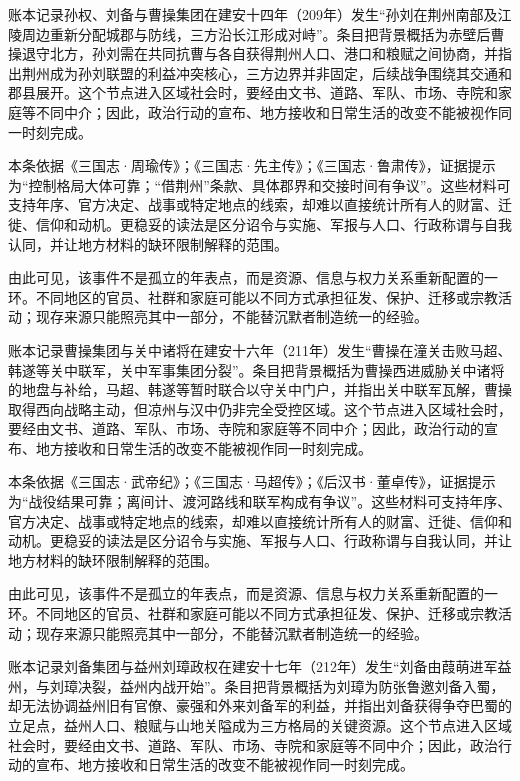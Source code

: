 账本记录孙权、刘备与曹操集团在建安十四年（209年）发生“孙刘在荆州南部及江陵周边重新分配城郡与防线，三方沿长江形成对峙”。条目把背景概括为赤壁后曹操退守北方，孙刘需在共同抗曹与各自获得荆州人口、港口和粮赋之间协商，并指出荆州成为孙刘联盟的利益冲突核心，三方边界并非固定，后续战争围绕其交通和郡县展开。这个节点进入区域社会时，要经由文书、道路、军队、市场、寺院和家庭等不同中介；因此，政治行动的宣布、地方接收和日常生活的改变不能被视作同一时刻完成。

本条依据《三国志·周瑜传》；《三国志·先主传》；《三国志·鲁肃传》，证据提示为“控制格局大体可靠；“借荆州”条款、具体郡界和交接时间有争议”。这些材料可支持年序、官方决定、战事或特定地点的线索，却难以直接统计所有人的财富、迁徙、信仰和动机。更稳妥的读法是区分诏令与实施、军报与人口、行政称谓与自我认同，并让地方材料的缺环限制解释的范围。

由此可见，该事件不是孤立的年表点，而是资源、信息与权力关系重新配置的一环。不同地区的官员、社群和家庭可能以不同方式承担征发、保护、迁移或宗教活动；现存来源只能照亮其中一部分，不能替沉默者制造统一的经验。

账本记录曹操集团与关中诸将在建安十六年（211年）发生“曹操在潼关击败马超、韩遂等关中联军，关中军事集团分裂”。条目把背景概括为曹操西进威胁关中诸将的地盘与补给，马超、韩遂等暂时联合以守关中门户，并指出关中联军瓦解，曹操取得西向战略主动，但凉州与汉中仍非完全受控区域。这个节点进入区域社会时，要经由文书、道路、军队、市场、寺院和家庭等不同中介；因此，政治行动的宣布、地方接收和日常生活的改变不能被视作同一时刻完成。

本条依据《三国志·武帝纪》；《三国志·马超传》；《后汉书·董卓传》，证据提示为“战役结果可靠；离间计、渡河路线和联军构成有争议”。这些材料可支持年序、官方决定、战事或特定地点的线索，却难以直接统计所有人的财富、迁徙、信仰和动机。更稳妥的读法是区分诏令与实施、军报与人口、行政称谓与自我认同，并让地方材料的缺环限制解释的范围。

由此可见，该事件不是孤立的年表点，而是资源、信息与权力关系重新配置的一环。不同地区的官员、社群和家庭可能以不同方式承担征发、保护、迁移或宗教活动；现存来源只能照亮其中一部分，不能替沉默者制造统一的经验。

账本记录刘备集团与益州刘璋政权在建安十七年（212年）发生“刘备由葭萌进军益州，与刘璋决裂，益州内战开始”。条目把背景概括为刘璋为防张鲁邀刘备入蜀，却无法协调益州旧有官僚、豪强和外来刘备军的利益，并指出刘备获得争夺巴蜀的立足点，益州人口、粮赋与山地关隘成为三方格局的关键资源。这个节点进入区域社会时，要经由文书、道路、军队、市场、寺院和家庭等不同中介；因此，政治行动的宣布、地方接收和日常生活的改变不能被视作同一时刻完成。

